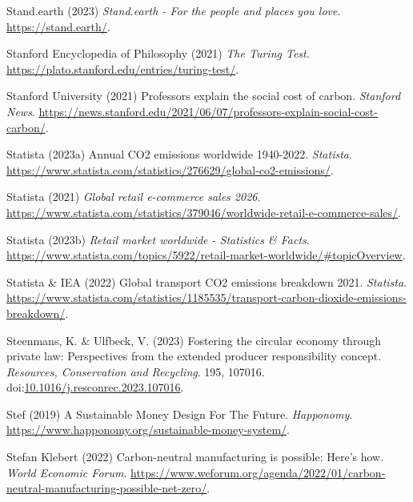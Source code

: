\documentclass[
  letterpaper,
  DIV=11,
  numbers=noendperiod]{scrartcl}
\newlength{\cslhangindent}
\newenvironment{CSLReferences}[2] %
 {\begin{list}{}{%
  \setlength{\itemindent}{0pt}
  \setlength{\leftmargin}{0pt}
  \setlength{\parsep}{0pt}
  \ifodd #1
   \setlength{\leftmargin}{\cslhangindent}
   \setlength{\itemindent}{-1\cslhangindent}
  \fi
  \setlength{\itemsep}{#2\baselineskip}}}
 {\end{list}}
\begin{document}
\begin{CSLReferences}{0}{1}
Stand.earth (2023) \emph{Stand.earth - {For} the people and places you
love}. \url{https://stand.earth/}.

Stanford Encyclopedia of Philosophy (2021) \emph{The {Turing Test}}.
\url{https://plato.stanford.edu/entries/turing-test/}.

Stanford University (2021) Professors explain the social cost of carbon.
\emph{Stanford News}.
\url{https://news.stanford.edu/2021/06/07/professors-explain-social-cost-carbon/}.

Statista (2023a) Annual {CO2} emissions worldwide 1940-2022.
\emph{Statista}.
\url{https://www.statista.com/statistics/276629/global-co2-emissions/}.

Statista (2021) \emph{Global retail e-commerce sales 2026}.
\url{https://www.statista.com/statistics/379046/worldwide-retail-e-commerce-sales/}.

Statista (2023b) \emph{Retail market worldwide - {Statistics} \&
{Facts}}.
\url{https://www.statista.com/topics/5922/retail-market-worldwide/\#topicOverview}.

Statista \& IEA (2022) Global transport {CO2} emissions breakdown 2021.
\emph{Statista}.
\url{https://www.statista.com/statistics/1185535/transport-carbon-dioxide-emissions-breakdown/}.

Steenmans, K. \& Ulfbeck, V. (2023) Fostering the circular economy
through private law: {Perspectives} from the extended producer
responsibility concept. \emph{Resources, Conservation and Recycling}.
195, 107016.
doi:\href{https://doi.org/10.1016/j.resconrec.2023.107016}{10.1016/j.resconrec.2023.107016}.

Stef (2019) A {Sustainable Money Design For The Future}.
\emph{Happonomy}.
\url{https://www.happonomy.org/sustainable-money-system/}.

Stefan Klebert (2022) Carbon-neutral manufacturing is possible: Here's
how. \emph{World Economic Forum}.
\url{https://www.weforum.org/agenda/2022/01/carbon-neutral-manufacturing-possible-net-zero/}.


\end{CSLReferences}
\end{document}
